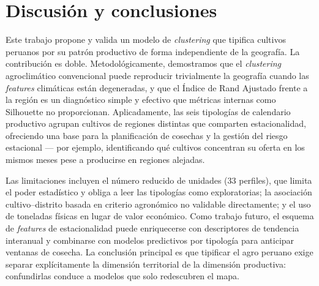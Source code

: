 \documentclass[conference]{IEEEtran}
\begin{document}
\section{Discusión y conclusiones}
Este trabajo propone y valida un modelo de \textit{clustering} que tipifica cultivos peruanos por su patrón productivo de forma independiente de la geografía. La contribución es doble. Metodológicamente, demostramos que el \textit{clustering} agroclimático convencional puede reproducir trivialmente la geografía cuando las \textit{features} climáticas están degeneradas, y que el Índice de Rand Ajustado frente a la región es un diagnóstico simple y efectivo que métricas internas como Silhouette no proporcionan. Aplicadamente, las seis tipologías de calendario productivo agrupan cultivos de regiones distintas que comparten estacionalidad, ofreciendo una base para la planificación de cosechas y la gestión del riesgo estacional --- por ejemplo, identificando qué cultivos concentran su oferta en los mismos meses pese a producirse en regiones alejadas.

Las limitaciones incluyen el número reducido de unidades (33 perfiles), que limita el poder estadístico y obliga a leer las tipologías como exploratorias; la asociación cultivo--distrito basada en criterio agronómico no validable directamente; y el uso de toneladas físicas en lugar de valor económico. Como trabajo futuro, el esquema de \textit{features} de estacionalidad puede enriquecerse con descriptores de tendencia interanual y combinarse con modelos predictivos por tipología para anticipar ventanas de cosecha. La conclusión principal es que tipificar el agro peruano exige separar explícitamente la dimensión territorial de la dimensión productiva: confundirlas conduce a modelos que solo redescubren el mapa.
\end{document}
